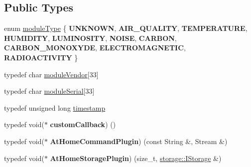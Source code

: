 \subsection*{Public Types}
\begin{DoxyCompactItemize}
\item 
enum \mbox{\hyperlink{classathome_1_1module_1_1_at_home_module_a5075522baeaab0de681c26a5e5f18cd3}{module\+Type}} \{ \newline
{\bfseries U\+N\+K\+N\+O\+WN}, 
{\bfseries A\+I\+R\+\_\+\+Q\+U\+A\+L\+I\+TY}, 
{\bfseries T\+E\+M\+P\+E\+R\+A\+T\+U\+RE}, 
{\bfseries H\+U\+M\+I\+D\+I\+TY}, 
\newline
{\bfseries L\+U\+M\+I\+N\+O\+S\+I\+TY}, 
{\bfseries N\+O\+I\+SE}, 
{\bfseries C\+A\+R\+B\+ON}, 
{\bfseries C\+A\+R\+B\+O\+N\+\_\+\+M\+O\+N\+O\+X\+Y\+DE}, 
\newline
{\bfseries E\+L\+E\+C\+T\+R\+O\+M\+A\+G\+N\+E\+T\+IC}, 
{\bfseries R\+A\+D\+I\+O\+A\+C\+T\+I\+V\+I\+TY}
 \}
\item 
typedef char \mbox{\hyperlink{classathome_1_1module_1_1_at_home_module_a90432f050114b268f7f7e0598dd8c9ac}{module\+Vendor}}\mbox{[}33\mbox{]}
\item 
typedef char \mbox{\hyperlink{classathome_1_1module_1_1_at_home_module_aff47a5cb8ee94041eb42fa673dea7a81}{module\+Serial}}\mbox{[}33\mbox{]}
\item 
typedef unsigned long \mbox{\hyperlink{classathome_1_1module_1_1_at_home_module_a661e1d39798077c49497844af658dc5d}{timestamp}}
\item 
\mbox{\label{classathome_1_1module_1_1_at_home_module_a4ae49e9e7d0e5f4e9f9148ef76a288dd}} 
typedef void($\ast$ {\bfseries custom\+Callback}) ()
\item 
\mbox{\label{classathome_1_1module_1_1_at_home_module_a46fbde0e1376feef862e5cf5ca7b2570}} 
typedef void($\ast$ {\bfseries At\+Home\+Command\+Plugin}) (const String \&, Stream \&)
\item 
\mbox{\label{classathome_1_1module_1_1_at_home_module_a5c269b52c37b8ad6cb73f1607aecb0db}} 
typedef void($\ast$ {\bfseries At\+Home\+Storage\+Plugin}) (size\+\_\+t, \mbox{\hyperlink{classathome_1_1storage_1_1_i_storage}{storage\+::\+I\+Storage}} \&)
\end{DoxyCompactItemize}

